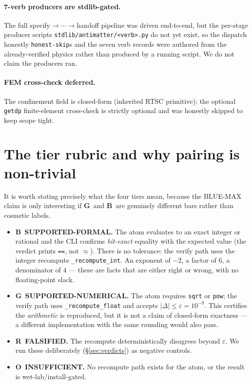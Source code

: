 \documentclass[11pt,a4paper]{article}
\newcommand{\tierBlue}{\textbf{B}}
\newcommand{\tierGreen}{\textbf{G}}
\newcommand{\tierRed}{\textbf{R}}
\newcommand{\tierOrange}{\textbf{O}}
\begin{document}
\paragraph{7-verb producers are stdlib-gated.} The full
specify$\to\cdots\to$handoff pipeline was driven end-to-end, but the
per-stage producer scripts \texttt{stdlib/antimatter/<verb>.py} do not yet
exist, so the dispatch honestly \texttt{honest-skip}s and the seven verb
records were authored from the already-verified physics rather than produced
by a running script. We do not claim the producers ran.

\paragraph{FEM cross-check deferred.} The confinement field is closed-form
(inherited RTSC primitive); the optional \texttt{getdp} finite-element
cross-check is strictly optional and was honestly skipped to keep scope
tight.

\section{The tier rubric and why pairing is non-trivial}
\label{sec:rubric}

It is worth stating precisely what the four tiers mean, because the
BLUE-MAX claim is only interesting if \tierGreen\ and \tierBlue\ are
genuinely different bars rather than cosmetic labels.

\begin{itemize}\itemsep0.2em
\item \tierBlue\ \textbf{SUPPORTED-FORMAL.} The atom evaluates to an exact
  integer or rational and the CLI confirms \emph{bit-exact} equality with
  the expected value (the verdict prints \texttt{==}, not $\approx$). There
  is no tolerance: the verify path uses the integer recompute
  \texttt{\_recompute\_int}. An exponent of $-2$, a factor of $6$, a
  denominator of $4$ --- these are facts that are either right or wrong, with
  no floating-point slack.
\item \tierGreen\ \textbf{SUPPORTED-NUMERICAL.} The atom requires
  \texttt{sqrt} or \texttt{pow}; the verify path uses
  \texttt{\_recompute\_float} and accepts $|\Delta|\le\varepsilon=10^{-9}$.
  This certifies the \emph{arithmetic} is reproduced, but it is not a claim
  of closed-form exactness --- a different implementation with the same
  rounding would also pass.
\item \tierRed\ \textbf{FALSIFIED.} The recompute deterministically
  disagrees beyond $\varepsilon$. We run these deliberately
  (\S\ref{sec:verdicts}) as negative controls.
\item \tierOrange\ \textbf{INSUFFICIENT.} No recompute path exists for the
  atom, or the result is wet-lab/install-gated.
\end{itemize}
\end{document}
